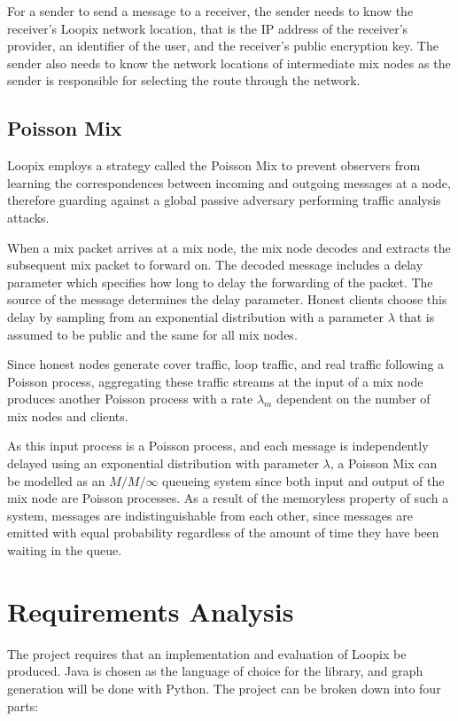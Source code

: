 \documentclass[final,dissertation.tex]{subfiles}
\begin{document}
For a sender to send a message to a receiver, the sender needs to know the receiver's Loopix network location, that is the IP address of the receiver's provider, an identifier of the user, and the receiver's public encryption key. The sender also needs to know the network locations of intermediate mix nodes as the sender is responsible for selecting the route through the network.

\subsection{Poisson Mix}

Loopix employs a strategy called the Poisson Mix to prevent observers from learning the correspondences between incoming and outgoing messages at a node, therefore guarding against a global passive adversary performing traffic analysis attacks. 

When a mix packet arrives at a mix node, the mix node decodes and extracts the subsequent mix packet to forward on. The decoded message includes a delay parameter which specifies how long to delay the forwarding of the packet. The source of the message determines the delay parameter. Honest clients choose this delay by sampling from an exponential distribution with a parameter $\lambda$ that is assumed to be public and the same for all mix nodes.

Since honest nodes generate cover traffic, loop traffic, and real traffic following a Poisson process, aggregating these traffic streams at the input of a mix node produces another Poisson process with a rate $\lambda_m$ dependent on the number of mix nodes and clients.

As this input process is a Poisson process, and each message is independently delayed using an exponential distribution with parameter $\lambda$, a Poisson Mix can be modelled as an $M/M/\infty$ queueing system since both input and output of the mix node are Poisson processes. As a result of the memoryless property of such a system, messages are indistinguishable from each other, since messages are emitted with equal probability regardless of the amount of time they have been waiting in the queue.

\section{Requirements Analysis}

The project requires that an implementation and evaluation of Loopix be produced. Java is chosen as the language of choice for the library, and graph generation will be done with Python. The project can be broken down into four parts:
\end{document}
